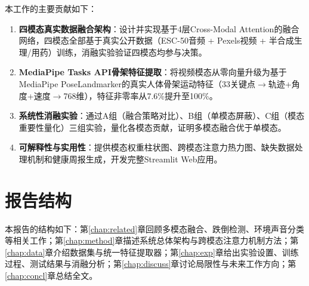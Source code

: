 本工作的主要贡献如下：

\begin{enumerate}
    \item \textbf{四模态真实数据融合架构}：设计并实现基于4层Cross-Modal Attention的融合网络，四模态全部基于真实公开数据（ESC-50音频\cite{piczak2015esc} + Pexels视频 + 半合成生理/用药）训练，消融实验验证四模态均参与决策。
    
    \item \textbf{MediaPipe Tasks API骨架特征提取}：将视频模态从零向量升级为基于MediaPipe PoseLandmarker\cite{lugaresi2019mediapipe}的真实人体骨架运动特征（33关键点$\to$轨迹+角度+速度$\to$768维），特征非零率从7.6\%提升至100\%。
    
    \item \textbf{系统性消融实验}：通过A组（融合策略对比）、B组（单模态屏蔽）、C组（模态重要性量化）三组实验，量化各模态贡献，证明多模态融合优于单模态。
    
    \item \textbf{可解释性与实用性}：提供模态权重柱状图、跨模态注意力热力图、缺失数据处理机制和健康周报生成，开发完整Streamlit Web应用。
\end{enumerate}

\section{报告结构}

本报告的结构如下：第\ref{chap:related}章回顾多模态融合、跌倒检测、环境声音分类等相关工作；第\ref{chap:method}章描述系统总体架构与跨模态注意力机制方法；第\ref{chap:data}章介绍数据集与统一特征提取器；第\ref{chap:exp}章给出实验设置、训练过程、测试结果与消融分析；第\ref{chap:discuss}章讨论局限性与未来工作方向；第\ref{chap:concl}章总结全文。
